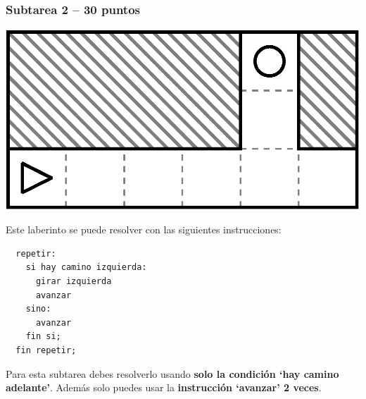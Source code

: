 \documentclass{oci}
\begin{document}
\subsubsection*{Subtarea 2 -- 30 puntos}
\begin{minipage}{0.5\linewidth}
  \centering
\includegraphics[scale=0.5]{laberintos/Subtarea2.eps}
\end{minipage}
\begin{minipage}{0.45\linewidth}

Este laberinto se puede resolver con las siguientes instrucciones:
\begin{verbatim}
  repetir:
    si hay camino izquierda:
      girar izquierda
      avanzar
    sino:
      avanzar
    fin si;
  fin repetir;
\end{verbatim}

Para esta subtarea debes resolverlo usando \textbf{solo la condición `hay camino adelante'}.
Además solo puedes usar la \textbf{instrucción `avanzar' 2 veces}.
\end{minipage}
\end{document}

